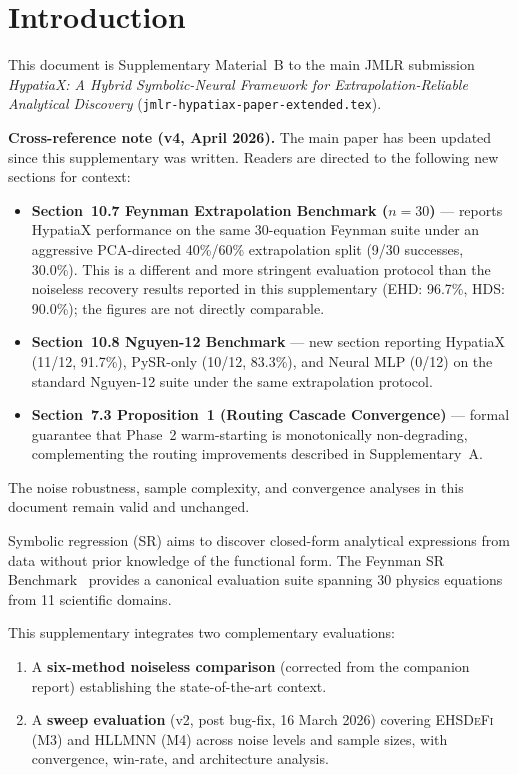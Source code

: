 \documentclass[twoside,11pt]{article}
\newcommand{\EHD}{\textsc{EHSDeFi}}
\newcommand{\HSL}{\textsc{HLLMNN}}
\begin{document}
\section{Introduction}
\label{sec:intro}

This document is Supplementary Material~B to the main JMLR submission
\emph{HypatiaX: A Hybrid Symbolic-Neural Framework for Extrapolation-Reliable
Analytical Discovery} (\texttt{jmlr-hypatiax-paper-extended.tex}).

\medskip
\noindent\textbf{Cross-reference note (v4, April 2026).}
The main paper has been updated since this supplementary was written.
Readers are directed to the following new sections for context:
\begin{itemize}
  \item \textbf{Section~10.7 Feynman Extrapolation Benchmark ($n=30$)} --- reports
    HypatiaX performance on the same 30-equation Feynman suite under an
    aggressive PCA-directed 40\%/60\% extrapolation split (9/30 successes,
    30.0\%).  This is a different and more stringent evaluation protocol
    than the noiseless recovery results reported in this supplementary
    (EHD: 96.7\%, HDS: 90.0\%); the figures are not directly comparable.
  \item \textbf{Section~10.8 Nguyen-12 Benchmark} --- new section reporting
    HypatiaX (11/12, 91.7\%), PySR-only (10/12, 83.3\%), and Neural MLP
    (0/12) on the standard Nguyen-12 suite under the same extrapolation
    protocol.
  \item \textbf{Section~7.3 Proposition~1 (Routing Cascade Convergence)} --- formal
    guarantee that Phase~2 warm-starting is monotonically non-degrading,
    complementing the routing improvements described in Supplementary~A.
\end{itemize}
The noise robustness, sample complexity, and convergence analyses in this
document remain valid and unchanged.

Symbolic regression (SR) aims to discover closed-form analytical expressions
from data without prior knowledge of the functional form.  The Feynman SR
Benchmark~\citep{udrescu2020ai} provides a canonical evaluation suite spanning
30 physics equations from 11 scientific domains.

This supplementary integrates two complementary evaluations:
\begin{enumerate}
  \item A \textbf{six-method noiseless comparison} (corrected from the
    companion report) establishing the state-of-the-art context.
  \item A \textbf{sweep evaluation} (v2, post bug-fix, 16 March 2026)
    covering \EHD{} (M3) and \HSL{} (M4) across noise levels and sample
    sizes, with convergence, win-rate, and architecture analysis.
\end{enumerate}
\end{document}

